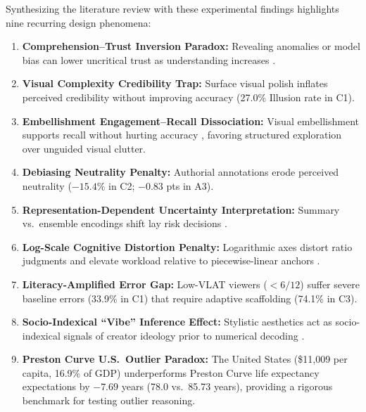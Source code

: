 \documentclass[conference]{IEEEtran}
\newcommand{\UsaChexPc}{\$11,009}
\newcommand{\UsaChexGdp}{16.9\%}
\newcommand{\UsaLeObs}{78.0}
\newcommand{\UsaLePred}{85.73}
\newcommand{\UsaLeResid}{-7.69}
\begin{document}
Synthesizing the literature review with these experimental findings highlights nine recurring design phenomena:
\begin{enumerate}
\item \textbf{Comprehension--Trust Inversion Paradox:} Revealing anomalies or model bias can lower uncritical trust as understanding increases \cite{kaufman2026,saha2020}.
\item \textbf{Visual Complexity Credibility Trap:} Surface visual polish inflates perceived credibility without improving accuracy \cite{song2026,elhamdadi2024} (27.0\% Illusion rate in C1).
\item \textbf{Embellishment Engagement--Recall Dissociation:} Visual embellishment supports recall without hurting accuracy \cite{bateman2010}, favoring structured exploration over unguided visual clutter.
\item \textbf{Debiasing Neutrality Penalty:} Authorial annotations erode perceived neutrality \cite{stokes2024} ($-15.4\%$ in C2; $-0.83$ pts in A3).
\item \textbf{Representation-Dependent Uncertainty Interpretation:} Summary vs.\ ensemble encodings shift lay risk decisions \cite{padilla2017,sarma2025}.
\item \textbf{Log-Scale Cognitive Distortion Penalty:} Logarithmic axes distort ratio judgments and elevate workload relative to piecewise-linear anchors \cite{batziakoudi2026}.
\item \textbf{Literacy-Amplified Error Gap:} Low-VLAT viewers ($< 6/12$) suffer severe baseline errors \cite{saske2024} (33.9\% in C1) that require adaptive scaffolding (74.1\% in C3).
\item \textbf{Socio-Indexical ``Vibe'' Inference Effect:} Stylistic aesthetics act as socio-indexical signals of creator ideology prior to numerical decoding \cite{morgenstern2026}.
\item \textbf{Preston Curve U.S.\ Outlier Paradox:} The United States (\UsaChexPc{} per capita, \UsaChexGdp{} of GDP) underperforms Preston Curve life expectancy expectations by $\UsaLeResid$ years (\UsaLeObs{} vs.\ \UsaLePred{} years), providing a rigorous benchmark for testing outlier reasoning.
\end{enumerate}
\end{document}
